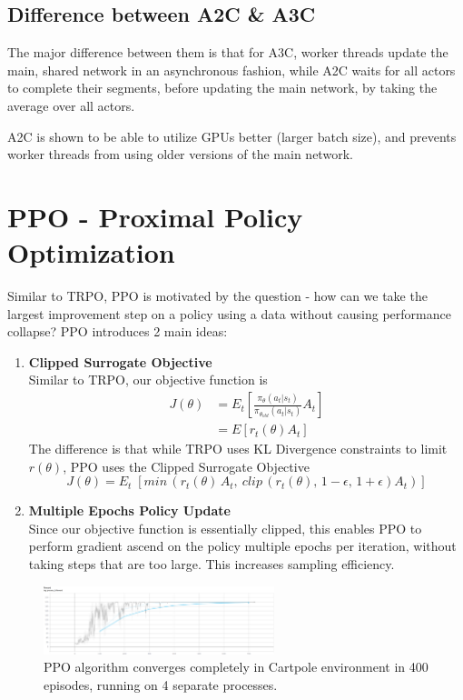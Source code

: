 \documentclass[12pt]{article} %
\begin{document}
\subsection{Difference between A2C \& A3C}
The major difference between them is that for A3C, worker threads update the main, shared network in an asynchronous fashion, while A2C waits for all actors to complete their segments, before updating the main network, by taking the average over all actors.

A2C is shown to be able to utilize GPUs better (larger batch size), and prevents worker threads from using older versions of the main network.

\section{PPO - Proximal Policy Optimization}
Similar to TRPO, PPO is motivated by the question - how can we take the largest improvement step on a policy using a data without causing performance collapse? PPO introduces 2 main ideas:
\begin{enumerate}
    \item \textbf{Clipped Surrogate Objective}\\
    Similar to TRPO, our objective function is 
    \begin{equation*}
    \begin{split}
        J(\theta) &= E_t[\frac{\pi_\theta(a_t|s_t)}{\pi_{\theta_{old}}(a_t|s_t)}A_t] \\
        &= E[r_t(\theta)A_t]
    \end{split}
    \end{equation*}
    The difference is that while TRPO uses KL Divergence constraints to limit $r(\theta)$, PPO uses the Clipped Surrogate Objective
    \begin{equation*}
        J(\theta) = E_t\;[min\,(r_t(\theta)\,A_t, \: clip\,(r_t(\theta),\, 1-\epsilon,\, 1+\epsilon)A_t)]
    \end{equation*}
    \item \textbf{Multiple Epochs Policy Update}\\
    Since our objective function is essentially clipped, this enables PPO to perform gradient ascend on the policy multiple epochs per iteration, without taking steps that are too large. This increases sampling efficiency.
\end{enumerate}
\begin{figure}
    \centering
    \includegraphics[width=0.6\textwidth]{images/ppo_cartpole.png}
    \caption{PPO algorithm converges completely in Cartpole environment in 400 episodes, running on 4 separate processes.}
    \label{fig:my_label}
\end{figure}
\end{document}
